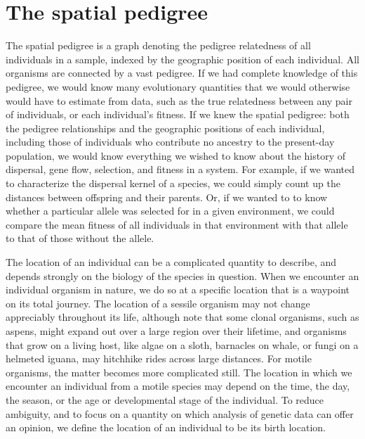 \documentclass{ar-1col}
\newcommand{\todo}[1]{{\textbf{\color{red}{#1}}}}
\begin{document}
\section{The spatial pedigree}


\todo{read through and edit}

The spatial pedigree is
a graph denoting the pedigree relatedness of all individuals in a sample,
indexed by the geographic position of each individual.
All organisms are connected by a vast pedigree.
If we had complete knowledge of this pedigree,
we would know many evolutionary quantities
that we would otherwise would have to estimate from data,
such as the true relatedness between any pair of individuals,
or each individual's fitness.
If we knew the spatial pedigree:
both the pedigree relationships
and the geographic positions of each individual,
including those of individuals
who contribute no ancestry to the present-day population,
we would know everything we wished to know about
the history of dispersal, gene flow,
selection, and fitness in a system.
For example, if we wanted to characterize the dispersal kernel of a species,
we could simply count up the distances between offspring and their parents.
Or, if we wanted to to know whether a particular allele
was selected for in a given environment,
we could compare the mean fitness of all individuals in that environment with that allele
to that of those without the allele.

The location of an individual can be a complicated quantity to describe,
and depends strongly on the biology of the species in question.
When we encounter an individual organism in nature,
we do so at a specific location
that is a waypoint on its total journey.
The location of a sessile organism
may not change appreciably throughout its life,
although note that some clonal organisms,
such as aspens,
might expand out over a large region over their lifetime,
and organisms that grow on a living host,
like algae on a sloth,
barnacles on whale,
or fungi on a helmeted iguana,
may hitchhike rides across large distances.
For motile organisms,
the matter becomes more complicated still.
The location in which we encounter an individual
from a motile species may depend
on the time, the day, the season,
or the age or developmental stage of the individual.
To reduce ambiguity,
and to focus on a quantity
on which analysis of genetic data can offer an opinion,
we define the location of an individual to be its birth location.
\end{document}
